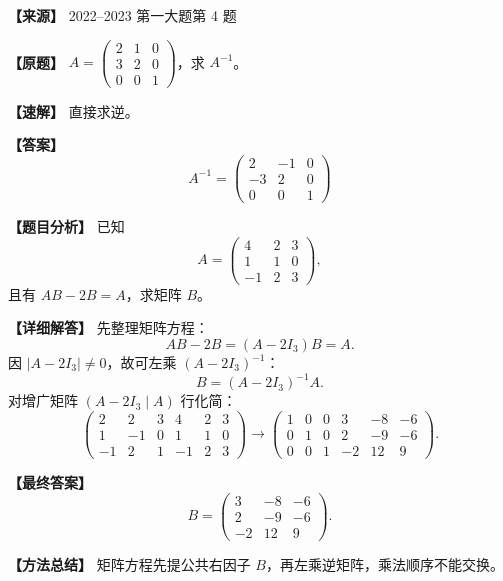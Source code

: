 \documentclass[11pt,a4paper,UTF8]{ctexart}
\begin{document}
\begin{answerbox}
\textbf{【来源】} 2022--2023 第一大题第 4 题

\textbf{【原题】}
$A=\begin{pmatrix}2&1&0\\3&2&0\\0&0&1\end{pmatrix}$，求 $A^{-1}$。

\textbf{【速解】}
直接求逆。

\textbf{【答案】}
\[A^{-1}=\begin{pmatrix}2&-1&0\\-3&2&0\\0&0&1\end{pmatrix}\]
\end{answerbox}

\begin{answerbox}
\textbf{【题目分析】} 已知
\[
A=\begin{pmatrix}4&2&3\\1&1&0\\-1&2&3\end{pmatrix},
\]
且有 $AB-2B=A$，求矩阵 $B$。

\textbf{【详细解答】} 先整理矩阵方程：
\[
AB-2B=(A-2I_3)B=A.
\]
因 $|A-2I_3|\ne0$，故可左乘 $(A-2I_3)^{-1}$：
\[
B=(A-2I_3)^{-1}A.
\]
对增广矩阵 $(A-2I_3\mid A)$ 行化简：
\[
\left(
\begin{array}{ccc|ccc}
2&2&3&4&2&3\\
1&-1&0&1&1&0\\
-1&2&1&-1&2&3
\end{array}
\right)
\to
\left(
\begin{array}{ccc|ccc}
1&0&0&3&-8&-6\\
0&1&0&2&-9&-6\\
0&0&1&-2&12&9
\end{array}
\right).
\]

\textbf{【最终答案】}
\[
B=
\begin{pmatrix}
3&-8&-6\\
2&-9&-6\\
-2&12&9
\end{pmatrix}.
\]

\textbf{【方法总结】} 矩阵方程先提公共右因子 $B$，再左乘逆矩阵，乘法顺序不能交换。
\end{answerbox}
\end{document}
